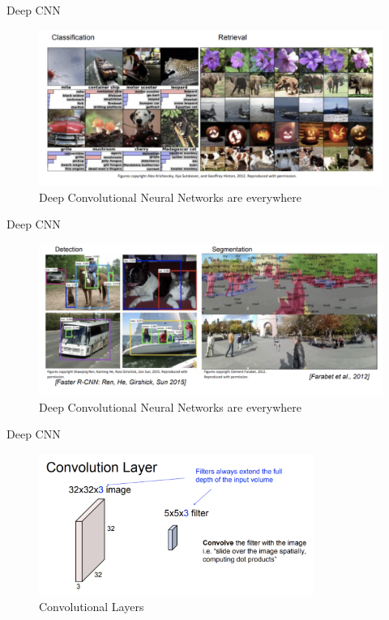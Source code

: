 \begin{frame}{Deep CNN}
\begin{figure}
    \centering
    \includegraphics[width=1\textwidth]{img/cnnex1.png}
    \caption{Deep Convolutional Neural Networks are everywhere}
\end{figure}

\end{frame}

\begin{frame}{Deep CNN}
\begin{figure}
    \centering
    \includegraphics[width=1\textwidth]{img/cnnex2.png}
    \caption{Deep Convolutional Neural Networks are everywhere}
\end{figure}
\end{frame}

\begin{frame}{Deep CNN}
\begin{figure}
    \centering
    \includegraphics[width=0.8\textwidth]{img/convlayer1.png}
    \caption{Convolutional Layers}
\end{figure}
\end{frame}

